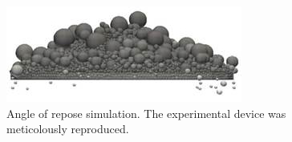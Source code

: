 \begin{figure}[!htb]
\centering
\includegraphics[width=.50\columnwidth]{images/065aorsim}
\caption[AoR sim]{Angle of repose simulation. The experimental device
was meticolously reproduced.}
\label{fig:065aorsim}
\end{figure}